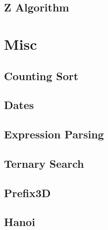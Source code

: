 \subsection{Z Algorithm}
\raggedbottom
\hrulefill

\section{Misc}
\subsection{Counting Sort}
\raggedbottom
\hrulefill
\subsection{Dates}
\raggedbottom
\hrulefill
\subsection{Expression Parsing}
\raggedbottom
\hrulefill
\subsection{Ternary Search}
\raggedbottom
\hrulefill
\subsection{Prefix3D}
\raggedbottom
\hrulefill
\subsection{Hanoi}
\raggedbottom
\hrulefill

